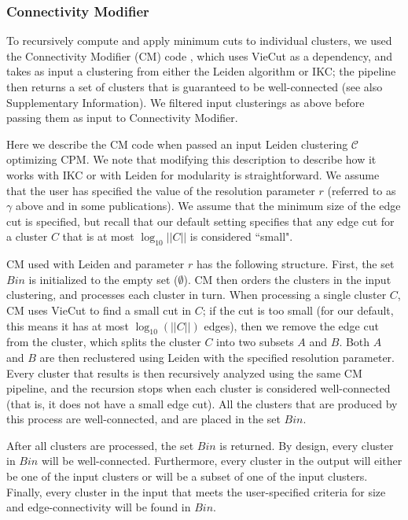 \documentclass[11pt]{article}   	%
\begin{document}
\subsubsection{Connectivity Modifier} To recursively compute and apply minimum cuts to individual clusters, we used the
Connectivity Modifier (CM) code  \citep{cm2022}, which uses VieCut \citep{Henzinger2018,Henzinger2019} as a dependency, and takes as input a clustering from either the Leiden algorithm or IKC; the pipeline then returns a set of clusters that is guaranteed to be well-connected (see also Supplementary Information). We filtered input clusterings as above before passing them as input to Connectivity Modifier.

Here we describe the CM code when passed an input  Leiden clustering $\mathcal{C}$  optimizing CPM. We note that modifying this description to describe how it works with IKC or with Leiden for modularity is straightforward.
We assume that the user has specified the value of the resolution parameter $r$ (referred to as $\gamma$ above and in some publications).
We assume that the minimum size of the edge cut is specified, but recall that our default setting specifies that any edge cut for a cluster $C$ that is at most $ \log _{10} ||C||$ is
considered ``small".

CM used with Leiden and parameter $r$ has the following structure.
First, the set $Bin$ is initialized to the empty set  ($\emptyset$).
CM  then orders the clusters in the input clustering, and   processes each cluster in  turn.
When processing a single cluster $C$,
CM uses VieCut to find a small cut in $C$;  if the cut is too small (for our default, this means it has at most $\log_{10}(||C||)$ edges), then
we remove the edge cut from the cluster, which splits the cluster $C$ into two  subsets $A$ and $B$.
Both $A$ and $B$ are then reclustered using Leiden with the specified resolution parameter.
Every cluster that results is then recursively analyzed using the same CM pipeline, and the recursion stops when each cluster is considered well-connected (that is, it does not have a small edge cut).
All the clusters that are produced by this process are well-connected, and are placed in the set $Bin$.

After all clusters are processed, the set $Bin$ is returned. By design, every cluster in  $Bin$ will be well-connected.
Furthermore, every cluster in the output will either be one of the input clusters or will be a subset of one of the input clusters.
Finally, every cluster in the input that meets the user-specified criteria for size and edge-connectivity will be found in $Bin$.
\end{document}
